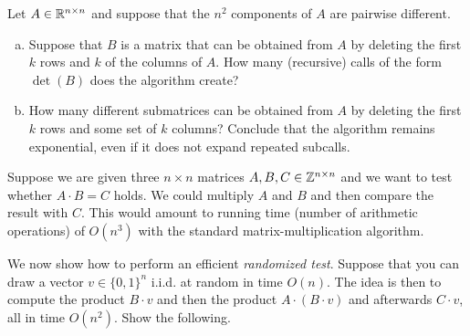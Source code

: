 \documentclass[11pt]{article}
\begin{document}
%
%  
%

Let $A \in \mathbb{R}^{n \times n}$  and suppose that the $n^2$ components of $A$ are pairwise different.
\begin{enumerate}[a)]
\item
Suppose that $B$ is a matrix that can be obtained from $A$ by deleting the first $k$ rows and $k$ of the columns of $A$. How many (recursive) calls of the form $\det(B)$ does the algorithm create? 

\item How many different submatrices can be obtained from $A$ by deleting the first $k$ rows and some set of $k$ columns? Conclude that the algorithm remains exponential, even if it does not expand repeated subcalls. 
\end{enumerate}

\problem Suppose we are given three $n \times n$ matrices $A,B,C \in \mathbb{Z}^{n \times n}$ and we want to test whether $A \cdot B = C$ holds. We could multiply $A$ and $B$ and then compare the result with $C$. This would amount to running time (number of arithmetic operations) of $O(n^3)$ with the standard matrix-multiplication algorithm. 

We now show how to perform an efficient \emph{randomized test}. Suppose that you can draw a vector $v \in \{0,1\}^n$  i.i.d. at random in time $O(n)$. The idea is then to compute the product $B \cdot v$ and then the product $A \cdot (B \cdot v)$ and afterwards $C \cdot v$, all in time $O(n^2)$. Show the following. 
\end{document}
